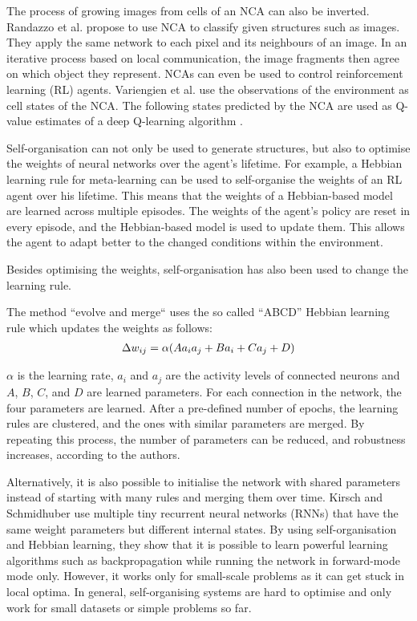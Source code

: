 The process of growing images from cells of an NCA can also be inverted.
Randazzo et al.  propose to use NCA to classify given structures such as images.
They apply the same network to each pixel and its neighbours of an image.
In an iterative process based on local communication, the image fragments then agree on which object they represent.
NCAs can even be used to control reinforcement learning (RL) agents.
Variengien et al.  use the observations of the environment as cell states of the NCA. The following states predicted by the NCA are used as Q-value estimates of a deep Q-learning algorithm .

Self-organisation can not only be used to generate structures, but also to optimise the weights of neural networks over the agent's lifetime.
For example, a Hebbian learning rule for meta-learning can be used to self-organise the weights of an RL agent over his lifetime.
This means that the weights of a Hebbian-based model are learned across multiple episodes.
The weights of the agent's policy are reset in every episode, and the Hebbian-based model is used to update them.
This allows the agent to adapt better to the changed conditions within the environment.

Besides optimising the weights, self-organisation has also been used to change the learning rule.

The method ``evolve and merge``  uses the so called ``ABCD'' Hebbian learning rule which updates the weights as follows:
\begin{align}\eqlbl{abcd_hebb_rule_risi}
	\Delta w_{ij} = \alpha (A a_i a_j + B a_i + C a_j + D)
\end{align}%

$\alpha$ is the learning rate, $a_i$ and $a_j$ are the activity levels of connected neurons and $A$, $B$, $C$, and $D$ are learned parameters.
For each connection in the network, the four parameters are learned.
After a pre-defined number of epochs, the learning rules are clustered, and the ones with similar parameters are merged.
By repeating this process, the number of parameters can be reduced, and robustness increases, according to the authors.

Alternatively, it is also possible to initialise the network with shared parameters instead of starting with many rules and merging them over time.
Kirsch and Schmidhuber  use multiple tiny recurrent neural networks (RNNs) that have the same weight parameters but different internal states.
By using self-organisation and Hebbian learning, they show that it is possible to learn powerful learning algorithms such as backpropagation while running the network in forward-mode mode only.
However, it works only for small-scale problems as it can get stuck in local optima.
In general, self-organising systems are hard to optimise and only work for small datasets or simple problems so far.

